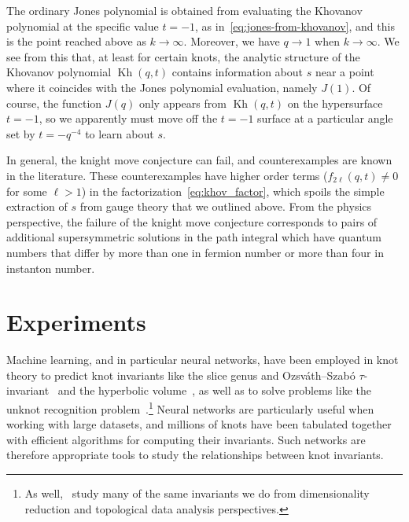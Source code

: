 \documentclass[11pt]{article}
\DeclareMathOperator{\Kh}{Kh}
\numberwithin{equation}{section}
\begin{document}
The ordinary Jones polynomial is obtained from evaluating the Khovanov polynomial at the specific value $t=-1$, as in~\eqref{eq:jones-from-khovanov}, and this is the point reached above as $k\to \infty$.
Moreover, we have $q \to 1$ when $k \to \infty$.
We see from this that, at least for certain knots, the analytic structure of the Khovanov polynomial $\Kh(q,t)$ contains information about $s$ near a point where it coincides with the Jones polynomial evaluation, namely $J(1)$.
Of course, the function $J(q)$ only appears from $\Kh(q,t)$ on the hypersurface $t=-1$, so we apparently must move off the $t=-1$ surface at a particular angle set by $t = -q^{-4}$ to learn about $s$.

In general, the knight move conjecture can fail, and counterexamples are known in the literature.
These counterexamples have higher order terms ($f_{2\ell}(q,t) \neq 0$ for some $\ell > 1$) in the factorization~\eqref{eq:khov_factor}, which spoils the simple extraction of $s$ from gauge theory that we outlined above.
From the physics perspective, the failure of the knight move conjecture corresponds to pairs of additional supersymmetric solutions in the path integral which have quantum numbers that differ by more than one in fermion number or more than four in instanton number.

\section{Experiments}\label{sec:exp}
Machine learning, and in particular neural networks, have been employed in knot theory to predict knot invariants like the slice genus and Ozsv\'ath--Szab\'o $\tau$-invariant~\cite{hughes2016neural} and the hyperbolic volume~\cite{Jejjala:2019kio,Craven:2020bdz}, as well as to solve problems like the unknot recognition problem~\cite{Gukov:2020qaj}.\footnote{
As well,~\cite{levitt2019big,pawel2021knot} study many of the same invariants we do from dimensionality reduction and topological data analysis perspectives.}
Neural networks are particularly useful when working with large datasets, and millions of knots have been tabulated together with efficient algorithms for computing their invariants.
Such networks are therefore appropriate tools to study the relationships between knot invariants. 
\end{document}
